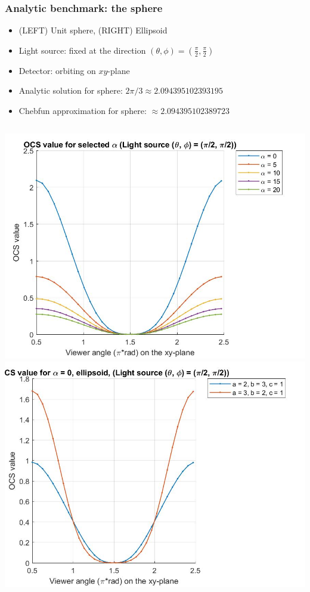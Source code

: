 \documentclass{beamer}
\begin{document}
\begin{frame}[t]
\frametitle{Analytic benchmark: the sphere}
\begin{itemize}
\item (LEFT) Unit sphere, (RIGHT) Ellipsoid
\item Light source: fixed at the direction $(\theta,\phi) = (\frac{\pi}{2},\frac{\pi}{2})$
\item Detector: orbiting on $xy$-plane
\item Analytic solution for sphere: $2\pi/3 \approx 2.094395102393195$
\item Chebfun approximation for sphere: $\approx 2.094395102389723$
\end{itemize}
\begin{columns}[c]
\centering \includegraphics[scale=0.21]{./figs/OCS_parallel_plane}
\centering \includegraphics[scale=0.21]{./figs/OCS_parallel_plane_ellipsoid}
\end{columns}
\end{frame}
\end{document}
